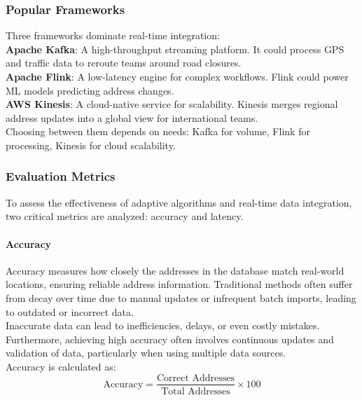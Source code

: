         \subsubsection{Popular Frameworks}

        Three frameworks dominate real-time integration: \\
        \textbf{Apache Kafka}: A high-throughput streaming platform. It could process GPS and traffic data to reroute teams around road closures.\\
        \textbf{Apache Flink}: A low-latency engine for complex workflows. Flink could power ML models predicting address changes.\\
        \textbf{AWS Kinesis}: A cloud-native service for scalability. Kinesis merges regional address updates into a global view for international teams.\\
        
        Choosing between them depends on needs: Kafka for volume, Flink for processing, Kinesis for cloud scalability. \autocite{Ranjbary2024Sep}


        \subsubsection{Evaluation Metrics}
        \label{sec:evaluation-metrics}

        To assess the effectiveness of adaptive algorithms and real-time data integration, two critical metrics are analyzed: accuracy and latency.

        \paragraph{Accuracy}
        \label{par:accuracy}

        Accuracy measures how closely the addresses in the database match real-world locations, ensuring reliable address information. Traditional methods often suffer from decay over time due to manual updates or infrequent batch imports, leading to outdated or incorrect data.  \\

        Inaccurate data can lead to inefficiencies, delays, or even costly mistakes. Furthermore, achieving high accuracy often involves continuous updates and validation of data, particularly when using multiple data sources. \autocite{GeeksforGeeks2024Oct}\\

        Accuracy is calculated as:
        \[
        \text{Accuracy} = \frac{\text{Correct Addresses}}{\text{Total Addresses}} \times 100
        \]
    

